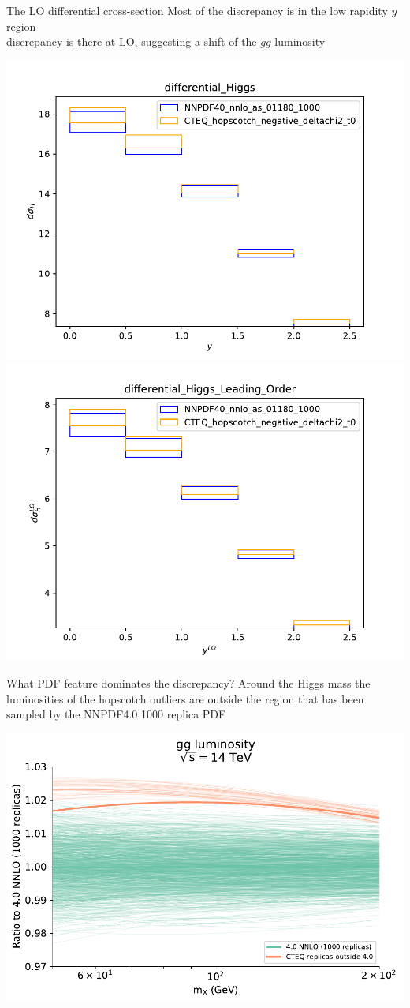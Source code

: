 \documentclass[aspectratio=169,10pt]{beamer}
\begin{document}
\begin{frame}[t]{The LO differential cross-section}
  Most of the discrepancy is in the low rapidity $y$ region\\
  \vspace*{0.5em}
  discrepancy is there at LO, suggesting a shift of the $gg$ luminosity
  \begin{center}
    \includegraphics[width=.48\textwidth]{differential_Higgs.pdf}
    \includegraphics[width=.48\textwidth]{differential_Higgs_Leading_Order.pdf}
  \end{center}
\end{frame}

\begin{frame}[t]{What PDF feature dominates the discrepancy?}
  Around the Higgs mass the luminosities of the hopscotch outliers are outside the region that has been sampled by the NNPDF4.0 1000 replica PDF\\
  \begin{center}
    \includegraphics[width=.48\textwidth]{plot_lumi1d_replicas.pdf}
  \end{center}
\end{frame}
\end{document}
